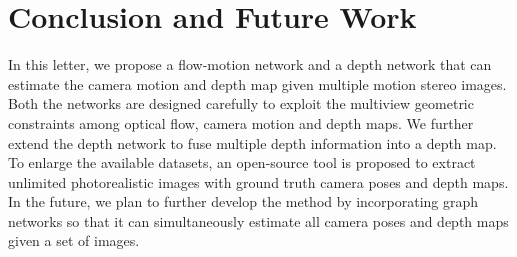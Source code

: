 \documentclass[letterpaper, 10 pt, conference]{ieeeconf}  %
\begin{document}
\section{Conclusion and Future Work}
In this letter, we propose a flow-motion network and a depth network that can estimate the camera motion and depth map given multiple motion stereo images. Both the networks are designed carefully to exploit the multiview geometric constraints among optical flow, camera motion and depth maps. We further extend the depth network to fuse multiple depth information into a depth map. To enlarge the available datasets, an open-source tool is proposed to extract unlimited photorealistic images with ground truth camera poses and depth maps. In the future, we plan to further develop the method by incorporating graph networks so that it can simultaneously estimate all camera poses and depth maps given a set of images.
 
{
% 


}
 
\end{document}
